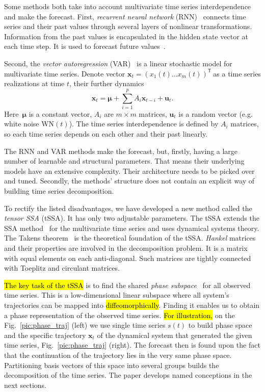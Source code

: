 \documentclass[referee, pdflatex, sn-mathphys-num]{sn-jnl}
\theoremstyle{definition}
\theoremstyle{plain}
\begin{document}
	Some methods both take into account multivariate time series interdependence and make the forecast. First, \emph{recurrent neural network} (RNN)~\cite{neco} connects time series and their past values through several layers of nonlinear transformations. Information from the past values is encapsulated in the hidden state vector at each time step. It is used to forecast future values~\cite{TEALAB2018334}.
	
	Second, the	\emph{vector autoregression} (VAR)~\cite{VAR_model1, doi:10.1080/01621459.1962.10480664} is a linear stochastic model for multivariate time series. Denote vector $ \mathbf{x}_t = (x_1(t) \ldots x_m(t))^{\mathsf{T}}~$as a time series realizations at time $ t $, their further dynamics	\begin{equation*}
		\mathbf{x}_t = \boldsymbol{\mu} + \sum\limits_{i = 1}^p A_i \mathbf{x}_{t - i} + \mathbf{u}_t.
	\end{equation*} Here~$\boldsymbol{\mu} $ is a constant vector, $A_i$ are $m \times m $ matrices, $ \mathbf{u}_t $ is a random vector (e.g. white noise $ \text{WN}(t) $). The time series interdependence is defined by $ A_i $ matrices, so each time series depends on each other and their past linearly.
	
	The RNN and VAR methods make the forecast, but, firstly, having a large number of learnable and structural parameters. That means their underlying models have an extensive complexity. Their architecture needs to be picked over and tuned. Secondly, the methods' structure does not contain an explicit way of building time series decomposition.
	
	To rectify the listed disadvantages, we have developed a new method called the \emph{tensor SSA} (tSSA). It has only two adjustable parameters. The tSSA extends the SSA method~\cite{ecfb9dc578be43ae9ee8fc88b8ff9151} for the multivariate time series and uses dynamical systems theory. The Takens theorem~\cite{citeulike:2735031} is the theoretical foundation of the tSSA. \emph{Hankel} matrices and their properties are involved in the decomposition problem. It is a matrix with equal elements on each anti-diagonal. Such matrices are tightly connected with Toeplitz and circulant matrices.
	
	\hl{The key task of the tSSA} is to find the shared \emph{phase subspace}~\cite{1572261550523548160, ignatov2016human} for all observed time series. This is a low-dimensional linear subspace where all system's trajectories can be mapped into \hl{diffeomorphically}. Finding it enables us to obtain a phase representation of the observed time series. \hl{For illustration,} on the Fig.~\ref{pic:phase_traj} (left) we use single time series $ s(t) $ to build phase space and the specific trajectory $ \mathbf{x}_t $ of the dynamical system that generated the given time series, Fig.~\ref{pic:phase_traj} (right). The forecast then is found upon the fact that the continuation of the trajectory lies in the very same phase space. Partitioning basis vectors of this space into several groups builds the decomposition of the time series. The paper develops named conceptions in the next sections.
	
\end{document}
